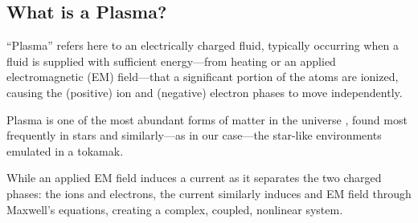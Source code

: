 \subsection*{What is a Plasma?}
    \line

    \begin{definition}[Plasma]
        ``Plasma'' refers here to an electrically charged fluid, typically occurring when a fluid is supplied with sufficient energy---from heating or an applied electromagnetic (EM) field---that a significant portion of the atoms  are ionized, causing the (positive) ion and (negative) electron phases to move independently.
    \end{definition}
    
    \line

    Plasma is one of the most abundant forms of matter in the universe \cite{CL13}, found most frequently in stars \cite{Phi95, Asc06, Pie17} and similarly---as in our case---the star-like environments emulated in a tokamak.
    
    While an applied EM field induces a current as it separates the two charged phases: the ions and electrons, the current similarly induces and EM field through Maxwell's equations, creating a complex, coupled, nonlinear system.
    \begin{center}\end{center}
    